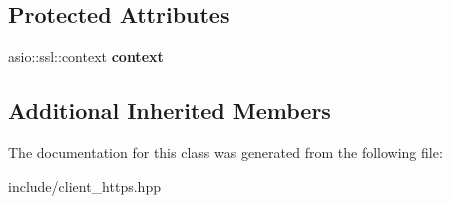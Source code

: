 \subsection*{Protected Attributes}
\begin{DoxyCompactItemize}
\item 
asio\+::ssl\+::context {\bfseries context}\hypertarget{classSimpleWeb_1_1Client_3_01HTTPS_01_4_a7fd6d293b7c68dbfd785347b1cfe01fc}{}\label{classSimpleWeb_1_1Client_3_01HTTPS_01_4_a7fd6d293b7c68dbfd785347b1cfe01fc}

\end{DoxyCompactItemize}
\subsection*{Additional Inherited Members}


The documentation for this class was generated from the following file\+:\begin{DoxyCompactItemize}
\item 
include/client\+\_\+https.\+hpp\end{DoxyCompactItemize}
